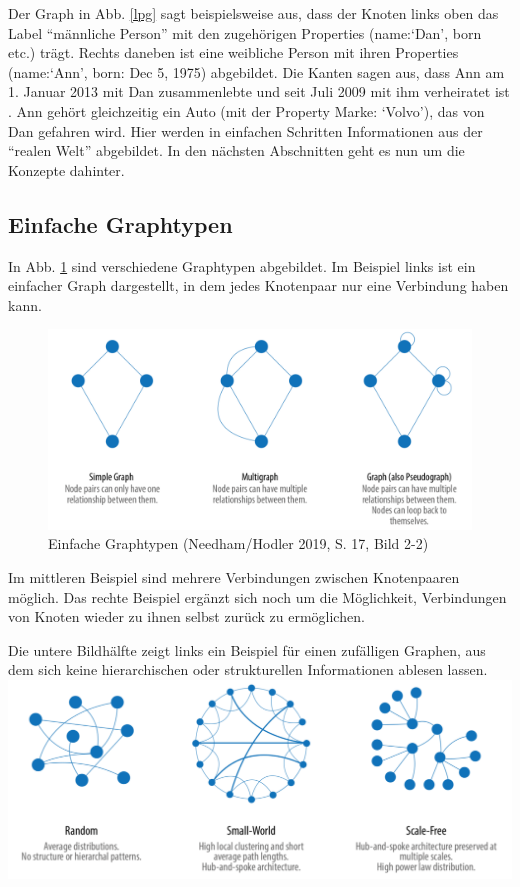 \documentclass[ngerman,]{scrreprt}
\begin{document}
Der Graph in Abb. \ref{lpg} sagt beispielsweise aus, dass der Knoten links oben das Label ``männliche Person'' mit den zugehörigen Properties (name:`Dan', born etc.) trägt. Rechts daneben ist eine weibliche Person mit ihren Properties (name:`Ann', born: Dec 5, 1975) abgebildet. Die Kanten sagen aus, dass Ann am 1. Januar 2013 mit Dan zusammenlebte und seit Juli 2009 mit ihm verheiratet ist . Ann gehört gleichzeitig ein Auto (mit der Property Marke: `Volvo'), das von Dan gefahren wird. Hier werden in einfachen Schritten Informationen aus der ``realen Welt'' abgebildet. In den nächsten Abschnitten geht es nun um die Konzepte dahinter.

\hypertarget{einfache-graphtypen}{%
\subsection{Einfache Graphtypen}\label{einfache-graphtypen}}

In Abb. \ref{einfachegraphtypen} sind verschiedene Graphtypen abgebildet. Im Beispiel links ist ein einfacher Graph dargestellt, in dem jedes Knotenpaar nur eine Verbindung haben kann.

\begin{figure}
\centering
\includegraphics{Bilder/Graph-Algorithms/17-2-2-TypesOfGraphs.png}
\caption{Einfache Graphtypen (Needham/Hodler 2019, S. 17, Bild 2-2)}
\label{einfachegraphtypen}
\end{figure}

Im mittleren Beispiel sind mehrere Verbindungen zwischen Knotenpaaren möglich. Das rechte Beispiel ergänzt sich noch um die Möglichkeit, Verbindungen von Knoten wieder zu ihnen selbst zurück zu ermöglichen.

Die untere Bildhälfte zeigt links ein Beispiel für einen zufälligen Graphen, aus dem sich keine hierarchischen oder strukturellen Informationen ablesen lassen. \includegraphics{Bilder/Graph-Algorithms/17-2-3-RandomSmallWorldScaleFree.png}
\end{document}
